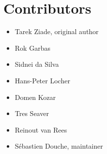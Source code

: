 \documentclass[letterpaper,10pt,english]{sphinxmanual}
\begin{document}
\section{Contributors}
\label{contributors::doc}\label{contributors:contributors}\begin{itemize}
\item {} 
Tarek Ziade, original author

\item {} 
Rok Garbas

\item {} 
Sidnei da Silva

\item {} 
Hans-Peter Locher

\item {} 
Domen Kozar

\item {} 
Tres Seaver

\item {} 
Reinout van Rees

\item {} 
Sébastien Douche, maintainer

\end{itemize}



\renewcommand{\indexname}{Index}
\printindex
\end{document}
